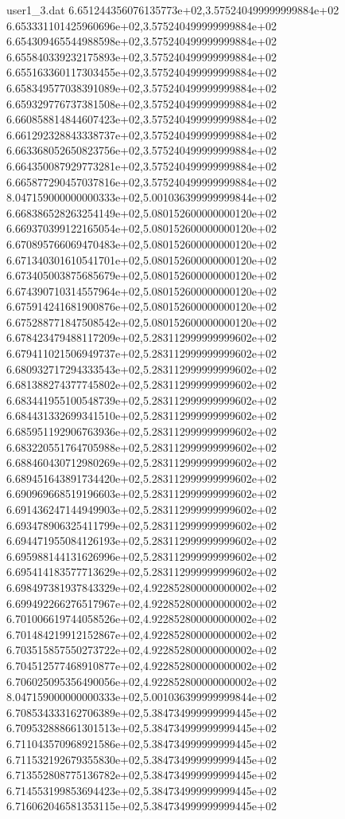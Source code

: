 \begin{filecontents}{user1_3.dat}
6.651244356076135773e+02,3.575240499999999884e+02
6.653331101425960696e+02,3.575240499999999884e+02
6.654309465544988598e+02,3.575240499999999884e+02
6.655840339232175893e+02,3.575240499999999884e+02
6.655163360117303455e+02,3.575240499999999884e+02
6.658349577038391089e+02,3.575240499999999884e+02
6.659329776737381508e+02,3.575240499999999884e+02
6.660858814844607423e+02,3.575240499999999884e+02
6.661292328843338737e+02,3.575240499999999884e+02
6.663368052650823756e+02,3.575240499999999884e+02
6.664350087929773281e+02,3.575240499999999884e+02
6.665877290457037816e+02,3.575240499999999884e+02
8.047159000000000333e+02,5.001036399999999844e+02
6.668386528263254149e+02,5.080152600000000120e+02
6.669370399122165054e+02,5.080152600000000120e+02
6.670895766069470483e+02,5.080152600000000120e+02
6.671340301610541701e+02,5.080152600000000120e+02
6.673405003875685679e+02,5.080152600000000120e+02
6.674390710314557964e+02,5.080152600000000120e+02
6.675914241681900876e+02,5.080152600000000120e+02
6.675288771847508542e+02,5.080152600000000120e+02
6.678423479488117209e+02,5.283112999999999602e+02
6.679411021506949737e+02,5.283112999999999602e+02
6.680932717294333543e+02,5.283112999999999602e+02
6.681388274377745802e+02,5.283112999999999602e+02
6.683441955100548739e+02,5.283112999999999602e+02
6.684431332699341510e+02,5.283112999999999602e+02
6.685951192906763936e+02,5.283112999999999602e+02
6.683220551764705988e+02,5.283112999999999602e+02
6.688460430712980269e+02,5.283112999999999602e+02
6.689451643891734420e+02,5.283112999999999602e+02
6.690969668519196603e+02,5.283112999999999602e+02
6.691436247144949903e+02,5.283112999999999602e+02
6.693478906325411799e+02,5.283112999999999602e+02
6.694471955084126193e+02,5.283112999999999602e+02
6.695988144131626996e+02,5.283112999999999602e+02
6.695414183577713629e+02,5.283112999999999602e+02
6.698497381937843329e+02,4.922852800000000002e+02
6.699492266276517967e+02,4.922852800000000002e+02
6.701006619744058526e+02,4.922852800000000002e+02
6.701484219912152867e+02,4.922852800000000002e+02
6.703515857550273722e+02,4.922852800000000002e+02
6.704512577468910877e+02,4.922852800000000002e+02
6.706025095356490056e+02,4.922852800000000002e+02
8.047159000000000333e+02,5.001036399999999844e+02
6.708534333162706389e+02,5.384734999999999445e+02
6.709532888661301513e+02,5.384734999999999445e+02
6.711043570968921586e+02,5.384734999999999445e+02
6.711532192679355830e+02,5.384734999999999445e+02
6.713552808775136782e+02,5.384734999999999445e+02
6.714553199853694423e+02,5.384734999999999445e+02
6.716062046581353115e+02,5.384734999999999445e+02

\end{filecontents}

